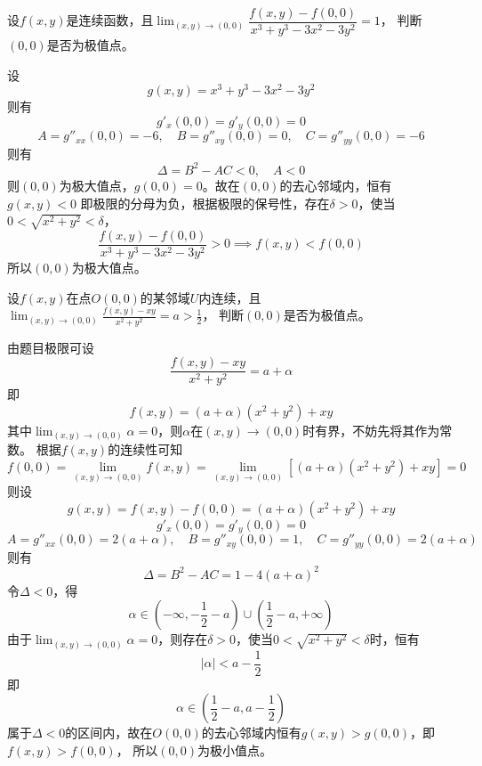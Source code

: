 \begin{example}
    设$f(x,y)$是连续函数，且$\lim_{(x,y)\to(0,0)}\dfrac{f(x,y)-f(0,0)}{x^3+y^3 - 3x^2 - 3y^2} = 1$，
    判断$(0,0)$是否为极值点。
\end{example}
\begin{solution}
    设
    \[ g(x,y) = x^3 + y^3 - 3x^2 -3y^2 \]
    则有
    \[ g'_x(0,0) = g'_y(0,0) = 0 \]
    \[ A = g''_{xx}(0,0) = -6, \quad B = g''_{xy}(0,0) = 0, \quad C = g''_{yy}(0,0) = -6 \]
    则有
    \[\Delta = B^2 - AC < 0, \quad A  < 0 \]
    则$(0,0)$为极大值点，$g(0,0) = 0$。故在$(0,0)$的去心邻域内，恒有$g(x,y)<0$
    即极限的分母为负，根据极限的保号性，存在$\delta > 0$，使当$0 < \sqrt{x^2 + y^2} < \delta$，
    \[
        \frac{f(x,y) - f(0,0)}{x^3 + y^3 - 3x^2 -3y^2} > 0 \implies f(x,y) < f(0,0)
    \]
    所以$(0,0)$为极大值点。
\end{solution}

\begin{example}
    设$f(x,y)$在点$O(0,0)$的某邻域$U$内连续，且$\lim_{(x,y)\to(0,0)}\frac{f(x,y) - xy}{x^2 + y^2} = a > \frac{1}{2}$，
    判断$(0,0)$是否为极值点。
\end{example}
\begin{solution}
    由题目极限可设
    \[ \frac{f(x,y) - xy}{x^2 + y^2} = a + \alpha \]
    即
    \[ f(x,y) = (a + \alpha)(x^2 + y^2) + xy \]
    其中$\lim_{(x,y)\to(0,0)} \alpha = 0$，则$\alpha$在$(x,y)\to(0,0)$时有界，不妨先将其作为常数。
    根据$f(x,y)$的连续性可知
    \[ f(0,0) = \lim_{(x,y)\to(0,0)} f(x,y) = \lim_{(x,y)\to(0,0)} [(a + \alpha)(x^2 + y^2) + xy] = 0 \]
    则设
    \[ g(x,y) = f(x,y) - f(0,0) = (a + \alpha)(x^2 + y^2) + xy \]
    \[ g'_x(0,0) = g'_y(0,0) = 0 \]
    \[ A = g''_{xx}(0,0) = 2(a+\alpha), \quad B=g''_{xy}(0,0) = 1,\quad C = g''_{yy}(0,0) = 2(a+\alpha) \]
    则有
    \[ \Delta = B^2 - AC = 1 - 4(a+\alpha)^2 \]
    令$\Delta < 0$，得
    \[ \alpha \in (-\infty,  - \frac{1}{2} - a) \cup (\frac{1}{2} - a, +\infty) \]
    由于$\lim_{(x,y)\to(0,0)} \alpha = 0$，则存在$\delta > 0$，使当$0<\sqrt{x^2 + y^2}<\delta$时，恒有
    \[ |\alpha| < a - \frac{1}{2} \]
    即
    \[ \alpha \in (\frac{1}{2} - a, a - \frac{1}{2}) \]
    属于$\Delta < 0$的区间内，故在$O(0,0)$的去心邻域内恒有$g(x,y) > g(0,0)$，即$f(x,y) > f(0,0)$，
    所以$(0,0)$为极小值点。
\end{solution}

